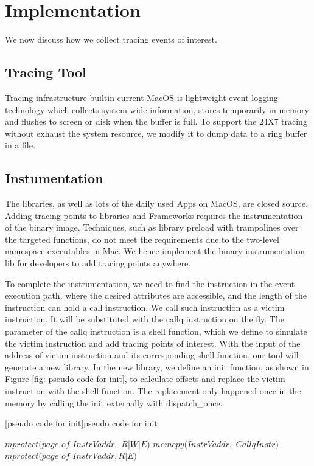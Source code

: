 \section{Implementation}
We now discuss how we collect tracing events of interest.

\subsection{Tracing Tool}
Tracing infrastructure builtin current MacOS is lightweight event logging technology which collects system-wide information, stores temporarily in memory and flushes to screen or disk when the buffer is full.
To support the 24X7 tracing without exhaust the system resource, we modify it to dump data to a ring buffer in a file.

\subsection{Instumentation}
The libraries, as well as lots of the daily used Apps on MacOS, are closed source.
Adding tracing points to libraries and Frameworks requires the instrumentation of the binary image.
Techniques, such as library preload with trampolines over the targeted functions, do not meet the requirements due to the two-level namespace executables in Mac.
We hence implement the binary instrumentation lib for developers to add tracing points anywhere.

To complete the instrumentation, we need to find the instruction in the event execution path, where the desired attributes are accessible, and the length of the instruction can hold a call instruction.
We call such instruction as a victim instruction.
It will be substituted with the callq instruction on the fly.
The parameter of the callq instruction is a shell function, which we define to simulate the victim instruction and add tracing points of interest.
With the input of the address of victim instruction and its corresponding shell function, our tool will generate a new library.
In the new library, we define an init function, as shown in Figure \ref{fig: pseudo code for init}, to calculate offsets and replace the victim instruction with the shell function.
The replacement only happened once in the memory by calling the init externally with dispatch\_once.

\begin{algorithm}
[pseudo code for init]{pseudo code for init}
\begin{algorithmic}[1]
\State $mprotect(page$ $of$ $InstrVaddr,$ $R|W|E)$
\State $memcpy(InstrVaddr,$ $CallqInstr)$
\State $mprotect(page$ $of$ $InstrVaddr, R|E)$
\EndFor
\EndProcedure
\end{algorithmic}
\label {fig:pseudo code for init}
\end{algorithm}

